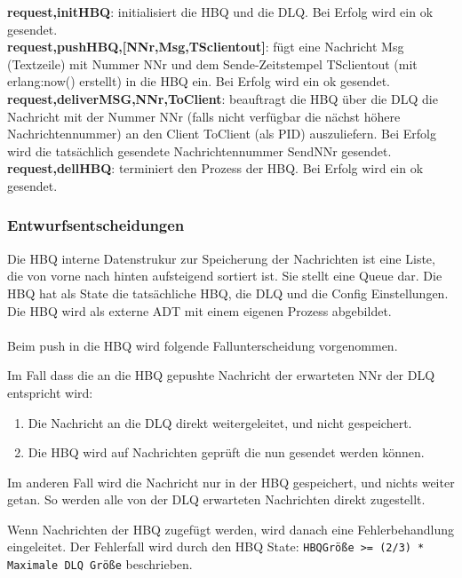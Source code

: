\documentclass{article}
\begin{document}
\textbf{{request,initHBQ}}: initialisiert die HBQ und die DLQ. Bei Erfolg wird ein ok gesendet.\\

\textbf{{request,pushHBQ,[NNr,Msg,TSclientout]}}: fügt eine Nachricht Msg (Textzeile) mit Nummer NNr und dem
Sende-Zeitstempel TSclientout (mit erlang:now() erstellt) in die HBQ ein. Bei Erfolg wird ein ok gesendet.\\

\textbf{{request,deliverMSG,NNr,ToClient}}: beauftragt die HBQ über die DLQ die Nachricht mit der Nummer NNr
(falls nicht verfügbar die nächst höhere Nachrichtennummer) an den Client ToClient (als PID) auszuliefern. Bei Erfolg
wird die tatsächlich gesendete Nachrichtennummer SendNNr gesendet.\\

\textbf{{request,dellHBQ}}: terminiert den Prozess der HBQ. Bei Erfolg wird ein ok gesendet.\\

\subsubsection{Entwurfsentscheidungen}
Die HBQ interne Datenstrukur zur Speicherung der Nachrichten ist eine Liste, die von vorne nach hinten aufsteigend
sortiert ist. Sie stellt eine Queue dar. Die HBQ hat als State die tatsächliche HBQ, die DLQ und die Config
Einstellungen. Die HBQ wird als externe ADT mit einem eigenen Prozess abgebildet.\\
\\
Beim push in die HBQ wird folgende Fallunterscheidung vorgenommen.

Im Fall dass die an die HBQ gepushte Nachricht der erwarteten NNr der DLQ entspricht wird:
	\begin{enumerate}
		\item{Die Nachricht an die DLQ direkt weitergeleitet, und nicht gespeichert.}
		\item{Die HBQ wird auf Nachrichten geprüft die nun gesendet werden können.}
	\end{enumerate}

Im anderen Fall wird die Nachricht nur in der HBQ gespeichert, und nichts weiter getan.
So werden alle von der DLQ erwarteten Nachrichten direkt zugestellt. 

Wenn Nachrichten der HBQ zugefügt werden, wird danach eine Fehlerbehandlung eingeleitet. Der Fehlerfall wird durch den
HBQ State: \texttt{HBQGröße >= (2/3) * Maximale DLQ Größe} beschrieben.\\
\end{document}
